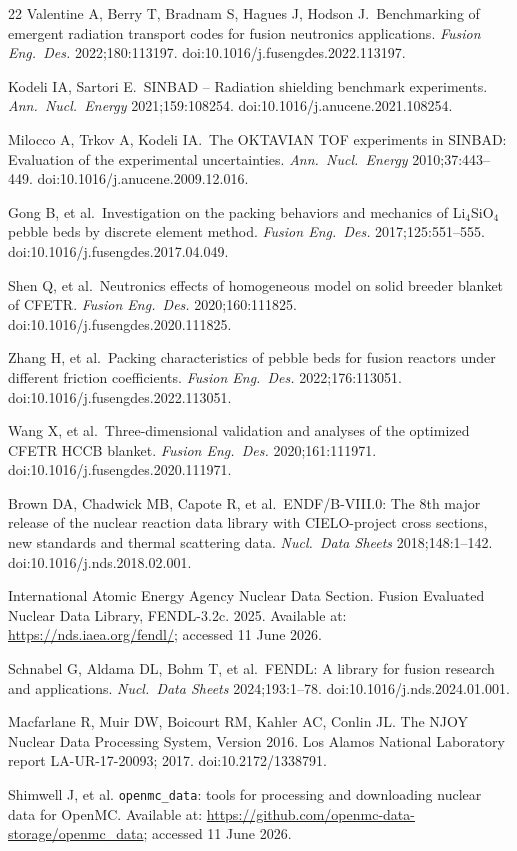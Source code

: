 \documentclass[preprint,12pt]{elsarticle}
\begin{document}
\begin{thebibliography}{22}
Valentine A, Berry T, Bradnam S, Hagues J, Hodson J.\ Benchmarking of emergent
radiation transport codes for fusion neutronics applications.
\textit{Fusion Eng.\ Des.} 2022;180:113197.
doi:10.1016/j.fusengdes.2022.113197.

Kodeli IA, Sartori E.\ SINBAD -- Radiation shielding benchmark experiments.
\textit{Ann.\ Nucl.\ Energy} 2021;159:108254.
doi:10.1016/j.anucene.2021.108254.

Milocco A, Trkov A, Kodeli IA.\ The OKTAVIAN TOF experiments in SINBAD:
Evaluation of the experimental uncertainties.
\textit{Ann.\ Nucl.\ Energy} 2010;37:443--449.
doi:10.1016/j.anucene.2009.12.016.

Gong B, et al.\ Investigation on the packing behaviors and mechanics of
Li$_4$SiO$_4$ pebble beds by discrete element method.
\textit{Fusion Eng.\ Des.} 2017;125:551--555.
doi:10.1016/j.fusengdes.2017.04.049.

Shen Q, et al.\ Neutronics effects of homogeneous model on solid breeder
blanket of CFETR. \textit{Fusion Eng.\ Des.} 2020;160:111825.
doi:10.1016/j.fusengdes.2020.111825.

Zhang H, et al.\ Packing characteristics of pebble beds for fusion reactors
under different friction coefficients.
\textit{Fusion Eng.\ Des.} 2022;176:113051.
doi:10.1016/j.fusengdes.2022.113051.

Wang X, et al.\ Three-dimensional validation and analyses of the optimized
CFETR HCCB blanket. \textit{Fusion Eng.\ Des.} 2020;161:111971.
doi:10.1016/j.fusengdes.2020.111971.

Brown DA, Chadwick MB, Capote R, et al.\ ENDF/B-VIII.0: The 8th major release
of the nuclear reaction data library with CIELO-project cross sections, new
standards and thermal scattering data. \textit{Nucl.\ Data Sheets}
2018;148:1--142. doi:10.1016/j.nds.2018.02.001.

International Atomic Energy Agency Nuclear Data Section. Fusion Evaluated
Nuclear Data Library, FENDL-3.2c. 2025. Available at:
\url{https://nds.iaea.org/fendl/}; accessed 11 June 2026.

Schnabel G, Aldama DL, Bohm T, et al.\ FENDL: A library for fusion research
and applications. \textit{Nucl.\ Data Sheets} 2024;193:1--78.
doi:10.1016/j.nds.2024.01.001.

Macfarlane R, Muir DW, Boicourt RM, Kahler AC, Conlin JL. The NJOY Nuclear
Data Processing System, Version 2016. Los Alamos National Laboratory report
LA-UR-17-20093; 2017. doi:10.2172/1338791.

Shimwell J, et al. \texttt{openmc\_data}: tools for processing and downloading
nuclear data for OpenMC. Available at:
\url{https://github.com/openmc-data-storage/openmc_data}; accessed 11 June
2026.

\end{thebibliography}
\end{document}
